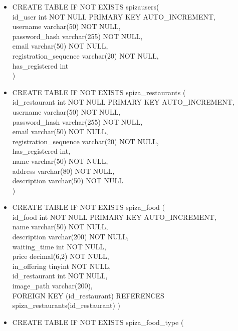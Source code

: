 \documentclass[12pt]{scrartcl}
\begin{document}
\begin{itemize}
 
    \item[] CREATE TABLE IF NOT EXISTS spiza\textunderscore users( \\
    id\_user int NOT NULL PRIMARY KEY AUTO\_INCREMENT,\\
    username varchar(50) NOT NULL,\\
    password\_hash varchar(255) NOT NULL,\\
    email varchar(50) NOT NULL,\\
    registration\_sequence varchar(20) NOT NULL,
    \\has\_registered int\\
    )
    \item[] CREATE TABLE IF NOT EXISTS spiza\_restaurants (\\
    id\_restaurant int NOT NULL PRIMARY KEY AUTO\_INCREMENT,\\
    username varchar(50) NOT NULL, \\
    password\_hash varchar(255) NOT NULL,\\
    email varchar(50) NOT NULL,\\
    registration\_sequence varchar(20) NOT NULL,\\
    has\_registered int,\\
    name varchar(50) NOT NULL,\\
    address varchar(80) NOT NULL,\\
    description varchar(50) NOT NULL\\
    )
    \item[] CREATE TABLE IF NOT EXISTS spiza\_food (\\
    id\_food int NOT NULL PRIMARY KEY AUTO\_INCREMENT,\\
    name varchar(50) NOT NULL,\\
    description varchar(200) NOT NULL,\\
    waiting\_time int NOT NULL,\\
    price decimal(6,2) NOT NULL,\\
    in\_offering tinyint NOT NULL,\\
    id\_restaurant int NOT NULL,\\
    image\_path varchar(200),\\
    FOREIGN KEY (id\_restaurant) REFERENCES spiza\_restaurants(id\_restaurant)
    )
    \item[] CREATE TABLE IF NOT EXISTS spiza\_food\_type (\\

\end{itemize}
\end{document}
